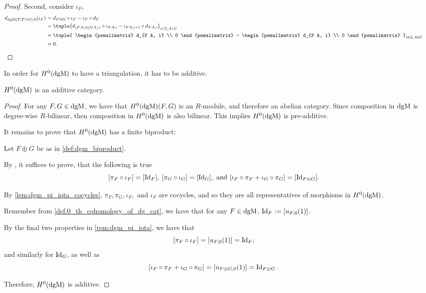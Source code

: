 \begin{proof}
    Second, consider \( \iota_F \),
    \begin{align*}
        d_{\dgM(F, F \oplus G), 0} ( \iota_F ) &= d_{F \oplus G} \circ \iota_F - \iota_F \circ d_F \\
        &= \tuple{ d_{(F A) \oplus (G A), i} \circ \iota_{F A, i} - \iota_{F A, i + 1} \circ d_{F A, i} }_{i \in \Zb, A \in \Cc} \\
        &= \tuple{
            \begin{psmallmatrix}
                d_{F A, i} \\
                0
            \end{psmallmatrix}
            -
            \begin{psmallmatrix}
                d_{F A, i} \\
                0
            \end{psmallmatrix}
        }_{i \in \Zb, A \in \Cc} \\
        &= 0.
    \end{align*}
\end{proof}

In order for \( H^0(\operatorname{dgM}) \) to have a triangulation, it has to be additive.

\begin{lemma}
    \( H^0(\operatorname{dgM}) \) is an additive category.
\end{lemma}
\begin{proof}
    For any \( F, G \in \operatorname{dgM} \), we have that \( H^0(\operatorname{dgM})(F, G) \) is an \( R \)-module, and therefore an abelian category. Since composition in \( \operatorname{dgM} \) is degree-wise \( R \)-bilinear, then composition in \( H^0(\operatorname{dgM}) \) is also bilinear. This implies \( H^0(\operatorname{dgM}) \) is pre-additive.

    It remains to prove that \( H^0(\operatorname{dgM}) \) has a finite biproduct:

    Let \( F \oplus G \) be as in \autoref{def:dgm_biproduct}.
    
    By \cite[p. 250]{Mac_Lane_1995}, it suffices to prove, that the following is true
    \[
        [\pi_F \circ \iota_F] = [\operatorname{Id}_F], \: [\pi_G \circ \iota_G] = [\operatorname{Id}_G], \text{ and } [\iota_F \circ \pi_F + \iota_G \circ \pi_G] = [\operatorname{Id}_{F \oplus G}].
    \]

    By \autoref{lem:dgm_pi_iota_cocycles}, \( \pi_F, \pi_G, \iota_F, \) and \( \iota_F \) are cocycles, and so they are all representatives of morphisms in \( H^0(\operatorname{dgM}) \).

    Remember from \autoref{def:0_th_cohomology_of_dg_cat}, we have that for any \( F \in \operatorname{dgM} \), \( \operatorname{Id}_F := [u_{F, 0} ( 1 )] \).

    By the final two properties in \autoref{rem:dgm_pi_iota}, we have that
    \[
        [\pi_F \circ \iota_F] = [u_{F, 0} (1)] = \operatorname{Id}_F,
    \]
    and similarly for \( \operatorname{Id}_G \), as well as
    \[
        [\iota_F \circ \pi_F + \iota_G \circ \pi_G] = [u_{F \oplus G, 0} (1)] = \operatorname{Id}_{F \oplus G}.
    \]

    Therefore, \( H^0(\operatorname{dgM}) \) is additive.
\end{proof}

